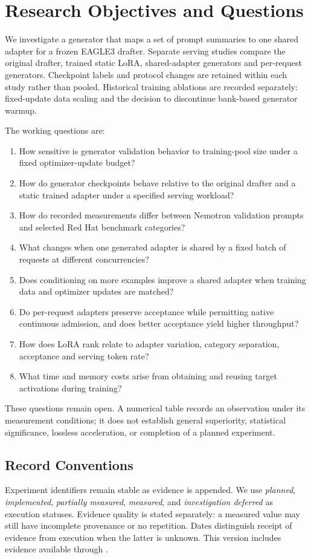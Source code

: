 \section{Research Objectives and Questions}
\label{sec:questions}

We investigate a generator that maps a set of prompt summaries to one shared
adapter for a frozen EAGLE3 drafter. Separate serving studies compare the
original drafter, trained static LoRA,
shared-adapter generators and per-request generators. Checkpoint labels and
protocol changes are retained within each study rather than pooled. Historical training
ablations are recorded separately: fixed-update data scaling and the decision
to discontinue bank-based generator warmup.

The working questions are:
\begin{enumerate}[leftmargin=*]
  \item How sensitive is generator validation behavior to training-pool size
  under a fixed optimizer-update budget?
  \item How do generator checkpoints behave relative to the original drafter and
  a static trained adapter under a specified serving workload?
  \item How do recorded measurements differ between Nemotron validation prompts
  and selected Red Hat benchmark categories?
  \item What changes when one generated adapter is shared by a fixed batch of
  requests at different concurrencies?
  \item Does conditioning on more examples improve a shared adapter when
  training data and optimizer updates are matched?
  \item Do per-request adapters preserve acceptance while permitting native
  continuous admission, and does better acceptance yield higher throughput?
  \item How does LoRA rank relate to adapter variation, category separation,
  acceptance and serving token rate?
  \item What time and memory costs arise from obtaining and reusing target
  activations during training?
\end{enumerate}

These questions remain open. A numerical table records an observation under its
measurement conditions; it does not establish general superiority, statistical
significance, lossless acceleration, or completion of a planned experiment.

\subsection{Record Conventions}
Experiment identifiers remain stable as evidence is appended. We use
\emph{planned}, \emph{implemented}, \emph{partially measured}, \emph{measured}, and
\emph{investigation deferred} as execution statuses. Evidence quality is stated
separately: a measured value may still have incomplete provenance or no repetition.
Dates distinguish receipt of evidence from execution when the latter is unknown.
This version includes evidence available through \evidencedate.
